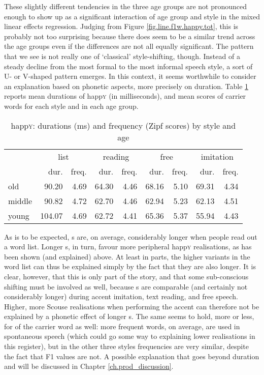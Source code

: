 These slightly different tendencies in the three age groups are not pronounced enough to show up as a significant interaction of age group and style in the mixed linear effects regression.
Judging from Figure \ref{fig.line.f1w.happy.tot}, this is probably not too surprising because there does seem to be a similar trend across the age groups even if the differences are not all equally significant.
The pattern that we see is not really one of `classical' style-shifting, though.
Instead of a steady decline from the most formal to the most informal speech style, a sort of U- or V-shaped pattern emerges.
In this context, it seems worthwhile to consider an explanation based on phonetic aspects, more precisely on duration.
Table \ref{tab.dur.style.happy} reports mean durations of happ\textsc{y} (in milliseconds), and mean  scores of carrier words for each style and in each age group.

\begin{table}[h!]
	\centering
	\caption{happ\textsc{y}: durations (ms) and frequency (Zipf scores) by style and age}
	\label{tab.dur.style.happy}
	\begin{tabular}{lrrrrrrrr}
		\hline
		& \multicolumn{2}{c}{list} & \multicolumn{2}{c}{reading} & \multicolumn{2}{c}{free} & \multicolumn{2}{c}{imitation\is{accent performance}}\\
		& dur. & freq. & dur. & freq. & dur. & freq. & dur. & freq.\\
		\hline
		old & 90.20 & 4.69 & 64.30 & 4.46 & 68.16 & 5.10 & 69.31 & 4.34\\
		middle & 90.82 & 4.72 & 62.70 & 4.46 & 62.94 & 5.23 & 62.13 & 4.51\\
		young & 104.07 & 4.69 & 62.72 & 4.41 & 65.36 & 5.37 & 55.94 & 4.43\\
		\hline
	\end{tabular}
\end{table}

As is to be expected, s are, on average, considerably longer when people read out a word list.
Longer s, in turn, favour more peripheral happ\textsc{y} realisations, as has been shown (and explained) above.
At least in parts, the higher variants in the word list can thus be explained simply by the fact that they are also longer.
It is clear, however, that this is only part of the story, and that some sub-conscious shifting must be involved as well, because s are comparable (and certainly not considerably longer) during accent imitation, text reading, and free speech.
Higher, more Scouse realisations when performing the accent can therefore not be explained by a phonetic effect of longer s.
The same seems to hold, more or less, for  of the carrier word as well: more frequent words, on average, are used in spontaneous speech (which could go some way to explaining lower realisations in this register), but in the other three styles frequencies are very similar, despite the fact that F1 values are not.
A possible explanation that goes beyond duration and  will be discussed in Chapter \ref{ch.prod_discussion}.

